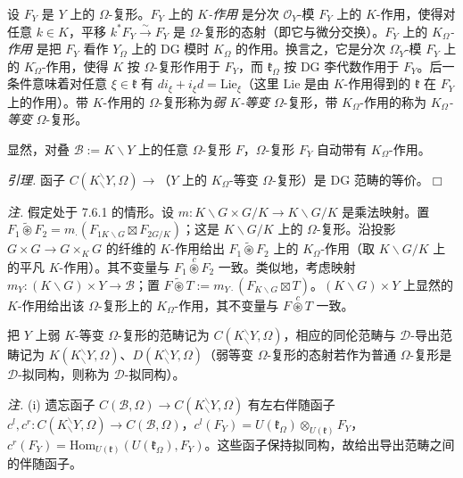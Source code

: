  设 $F_{Y}$ 是 $Y$ 上的 $\Omega$-复形。$F_{Y}$ 上的 \emph{$K$-作用} 是分次 $\mathcal{O}_{Y}$-模 $F^{\cdot}_{Y}$ 上的 $K$-作用，使得对任意 $k\in K$，平移 $k^{*}F^{\cdot}_{Y}\xrightarrow{\sim}F^{\cdot}_{Y}$ 是 $\Omega$-复形的态射（即它与微分交换）。$F_{Y}$ 上的 \emph{$K_{\Omega}$-作用} 是把 $F_{Y}$ 看作 $Y_{\Omega}$ 上的 DG 模时 $K_{\Omega}$ 的作用。换言之，它是分次 $\Omega^{\cdot}_{Y}$-模 $F^{\cdot}_{Y}$ 上的 $K^{\cdot}_{\Omega}$-作用，使得 $K$ 按 $\Omega$-复形作用于 $F_{Y}$，而 $\mathfrak{k}_{\Omega}$ 按 DG 李代数作用于 $F_{Y}$。后一条件意味着对任意 $\xi\in\mathfrak{k}$ 有 $di_{\xi}+i_{\xi}d=\mathrm{Lie}_{\xi}$（这里 $\mathrm{Lie}$ 是由 $K$-作用得到的 $\mathfrak{k}$ 在 $F^{\cdot}_{Y}$ 上的作用）。带 $K$-作用的 $\Omega$-复形称为\emph{弱 $K$-等变} $\Omega$-复形，带 $K_{\Omega}$-作用的称为 \emph{$K_{\Omega}$-等变} $\Omega$-复形。

显然，对叠 $\mathcal{B}:=K\backslash Y$ 上的任意 $\Omega$-复形 $F$，$\Omega$-复形 $F_{Y}$ 自动带有 $K_{\Omega}$-作用。

 \emph{引理.} 函子 $C(K^{\backslash}_{\backslash}Y,\Omega)\longrightarrow$（$Y$ 上的 $K_{\Omega}$-等变 $\Omega$-复形）是 DG 范畴的等价。\hfill$\Box$


 \emph{注.} 假定处于 7.6.1 的情形。设 $m:K\backslash G\times G/K\to K\backslash G/K$ 是乘法映射。置 $F_{1}\widetilde{\circledast}F_{2}=m_{\cdot}(F_{1K\backslash G}\boxtimes F_{2G/K})$；这是 $K\backslash G/K$ 上的 $\Omega$-复形。沿投影 $G\times G\to G\times_{K}G$ 的纤维的 $K$-作用给出 $F_{1}\widetilde{\circledast}F_{2}$ 上的 $K_{\Omega}$-作用（取 $K\backslash G/K$ 上的平凡 $K$-作用）。其不变量与 $F_{1}\overset{c}{\circledast}F_{2}$ 一致。类似地，考虑映射 $m_{Y}:(K\backslash G)\times Y\to\mathcal{B}$；置 $F\widetilde{\circledast}T:=m_{Y\cdot}(F_{K\backslash G}\boxtimes T)$。$(K\backslash G)\times Y$ 上显然的 $K$-作用给出该 $\Omega$-复形上的 $K_{\Omega}$-作用，其不变量与 $F\overset{c}{\circledast}T$ 一致。


 把 $Y$ 上弱 $K$-等变 $\Omega$-复形的范畴记为 $C(K^{\backslash}_{\backslash}Y,\Omega)$，相应的同伦范畴与 $\mathcal{D}$-导出范畴记为 $K(K^{\backslash}_{\backslash}Y,\Omega)$、$D(K^{\backslash}_{\backslash}Y,\Omega)$（弱等变 $\Omega$-复形的态射若作为普通 $\Omega$-复形是 $\mathcal{D}$-拟同构，则称为 $\mathcal{D}$-拟同构）。

 \emph{注.} (i) 遗忘函子 $C(\mathcal{B},\Omega)\to C(K^{\backslash}_{\backslash}Y,\Omega)$ 有左右伴随函子 $c^{l},c^{r}:C(K^{\backslash}_{\backslash}Y,\Omega)\to C(\mathcal{B},\Omega)$，$c^{l}(F_{Y})=U(\mathfrak{k}_{\Omega})\otimes_{U(\mathfrak{k})}F_{Y}$，$c^{r}(F_{Y})=\mathrm{Hom}_{U(\mathfrak{k})}(U(\mathfrak{k}_{\Omega}),F_{Y})$。这些函子保持拟同构，故给出导出范畴之间的伴随函子。

